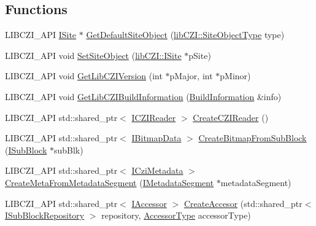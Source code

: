 \subsection*{Functions}
\begin{DoxyCompactItemize}
\item 
L\+I\+B\+C\+Z\+I\+\_\+\+A\+PI \hyperlink{classlib_c_z_i_1_1_i_site}{I\+Site} $\ast$ \hyperlink{namespacelib_c_z_i_a12210a6ee4bbda8306b25648f2c4833d}{Get\+Default\+Site\+Object} (\hyperlink{namespacelib_c_z_i_a77743727a5f0709a64237e58b9254983}{lib\+C\+Z\+I\+::\+Site\+Object\+Type} type)
\item 
L\+I\+B\+C\+Z\+I\+\_\+\+A\+PI void \hyperlink{namespacelib_c_z_i_a19b47bdfc502b06cbee0166ac5da6a3e}{Set\+Site\+Object} (\hyperlink{classlib_c_z_i_1_1_i_site}{lib\+C\+Z\+I\+::\+I\+Site} $\ast$p\+Site)
\item 
L\+I\+B\+C\+Z\+I\+\_\+\+A\+PI void \hyperlink{namespacelib_c_z_i_a4ae53e1905b54a5b8ddb95ef62817e95}{Get\+Lib\+C\+Z\+I\+Version} (int $\ast$p\+Major, int $\ast$p\+Minor)
\item 
L\+I\+B\+C\+Z\+I\+\_\+\+A\+PI void \hyperlink{namespacelib_c_z_i_aa8ab65987d0101d1e6a7f7a8c5f0941e}{Get\+Lib\+C\+Z\+I\+Build\+Information} (\hyperlink{structlib_c_z_i_1_1_build_information}{Build\+Information} \&info)
\item 
L\+I\+B\+C\+Z\+I\+\_\+\+A\+PI std\+::shared\+\_\+ptr$<$ \hyperlink{classlib_c_z_i_1_1_i_c_z_i_reader}{I\+C\+Z\+I\+Reader} $>$ \hyperlink{namespacelib_c_z_i_abe978d8bd50abe94c2d37df6212859e8}{Create\+C\+Z\+I\+Reader} ()
\item 
L\+I\+B\+C\+Z\+I\+\_\+\+A\+PI std\+::shared\+\_\+ptr$<$ \hyperlink{classlib_c_z_i_1_1_i_bitmap_data}{I\+Bitmap\+Data} $>$ \hyperlink{namespacelib_c_z_i_aca46f77d360ed5fadb9ff68835f80bfb}{Create\+Bitmap\+From\+Sub\+Block} (\hyperlink{classlib_c_z_i_1_1_i_sub_block}{I\+Sub\+Block} $\ast$sub\+Blk)
\item 
L\+I\+B\+C\+Z\+I\+\_\+\+A\+PI std\+::shared\+\_\+ptr$<$ \hyperlink{classlib_c_z_i_1_1_i_czi_metadata}{I\+Czi\+Metadata} $>$ \hyperlink{namespacelib_c_z_i_a69621b531d30747728a2fd37eb5286c2}{Create\+Meta\+From\+Metadata\+Segment} (\hyperlink{classlib_c_z_i_1_1_i_metadata_segment}{I\+Metadata\+Segment} $\ast$metadata\+Segment)
\item 
L\+I\+B\+C\+Z\+I\+\_\+\+A\+PI std\+::shared\+\_\+ptr$<$ \hyperlink{classlib_c_z_i_1_1_i_accessor}{I\+Accessor} $>$ \hyperlink{namespacelib_c_z_i_a036375c3761cc8ea54022d37000ae0ae}{Create\+Accesor} (std\+::shared\+\_\+ptr$<$ \hyperlink{classlib_c_z_i_1_1_i_sub_block_repository}{I\+Sub\+Block\+Repository} $>$ repository, \hyperlink{namespacelib_c_z_i_aa626474324df92c9cdc7258cdb1e677c}{Accessor\+Type} accessor\+Type)

\end{DoxyCompactItemize}
